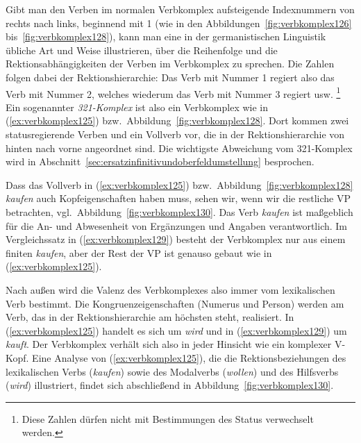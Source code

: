 Gibt man den Verben im normalen Verbkomplex aufsteigende Indexnummern von rechts nach links, beginnend mit 1 (wie in den Abbildungen~\ref{fig:verbkomplex126} bis~\ref{fig:verbkomplex128}), kann man eine in der germanistischen Linguistik übliche Art und Weise illustrieren, über die Reihenfolge und die Rektionsabhängigkeiten der Verben im Verbkomplex zu sprechen.
Die Zahlen folgen dabei der Rektionshierarchie:
Das Verb mit Nummer 1 regiert also das Verb mit Nummer 2, welches wiederum das Verb mit Nummer 3 regiert usw.%
\footnote{Diese Zahlen dürfen nicht mit Bestimmungen des Status verwechselt werden.}
Ein sogenannter \textit{321-Komplex} ist also ein Verbkomplex wie in (\ref{ex:verbkomplex125}) bzw.\ Abbildung~\ref{fig:verbkomplex128}.
Dort kommen zwei statusregierende Verben und ein Vollverb vor, die in der Rektionshierarchie von hinten nach vorne angeordnet sind.
Die wichtigste Abweichung vom 321-Komplex wird in Abschnitt~\ref{sec:ersatzinfinitivundoberfeldumstellung} besprochen.

Dass das Vollverb in (\ref{ex:verbkomplex125}) bzw.\ Abbildung~\ref{fig:verbkomplex128} \textit{kaufen} auch Kopfeigenschaften haben muss, sehen wir, wenn wir die restliche VP betrachten, vgl.\ Abbildung~\ref{fig:verbkomplex130}.
Das Verb \textit{kaufen} ist maßgeblich für die An- und Abwesenheit von Ergänzungen und Angaben verantwortlich.
Im Vergleichssatz in (\ref{ex:verbkomplex129}) besteht der Verbkomplex nur aus einem finiten \textit{kaufen}, aber der Rest der VP ist genauso gebaut wie in (\ref{ex:verbkomplex125}).

\begin{exe}
\end{exe}

Nach außen wird die Valenz des Verbkomplexes also immer vom lexikalischen Verb bestimmt.
Die Kongru\-enz\-ei\-gen\-schaf\-ten (Numerus und Person) werden am Verb, das in der Rektionshierarchie am höchsten steht, realisiert.
In (\ref{ex:verbkomplex125}) handelt es sich um \textit{wird} und in (\ref{ex:verbkomplex129}) um \textit{kauft}.
Der Verbkomplex verhält sich also in jeder Hinsicht wie ein komplexer V-Kopf.
Eine Analyse von (\ref{ex:verbkomplex125}), die die Rektionsbeziehungen des lexikalischen Verbs (\textit{kaufen}) sowie des Modalverbs (\textit{wollen}) und des Hilfsverbs (\textit{wird}) illustriert, findet sich abschließend in Abbildung~\ref{fig:verbkomplex130}.



